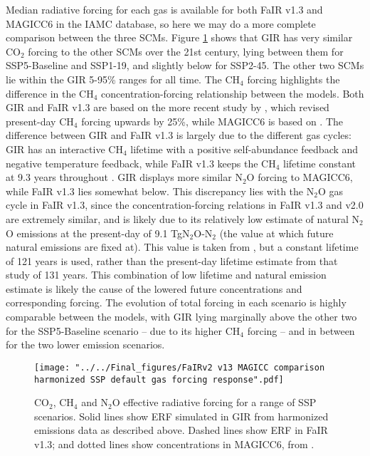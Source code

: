 \documentclass[gmd, manuscript]{copernicus}
\begin{document}
Median radiative forcing for each gas is available for both FaIR v1.3 and MAGICC6 in the IAMC database, so here we may do a more complete comparison between the three SCMs. Figure \ref{fig:SSPforcs} shows that GIR has very similar CO$_2$ forcing to the other SCMs over the 21st century, lying between them for SSP5-Baseline and SSP1-19, and slightly below for SSP2-45. The other two SCMs lie within the GIR 5-95\% ranges for all time. The CH$_4$ forcing highlights the difference in the CH$_4$ concentration-forcing relationship between the models. Both GIR and FaIR v1.3 are based on the more recent study by \cite{Etminan2016}, which revised present-day CH$_4$ forcing upwards by 25\%, while MAGICC6 is based on \cite{Myhre2013a}. The difference between GIR and FaIR v1.3 is largely due to the different gas cycles: GIR has an interactive CH$_4$ lifetime with a positive self-abundance feedback and negative temperature feedback, while FaIR v1.3 keeps the CH$_4$ lifetime constant at 9.3 years throughout \citep{Smith2017}. GIR displays more similar N$_2$O forcing to MAGICC6, while FaIR v1.3 lies somewhat below. This discrepancy lies with the N$_2$O gas cycle in FaIR v1.3, since the concentration-forcing relations in FaIR v1.3 and v2.0 are extremely similar, and is likely due to its relatively low estimate of natural N$_2$O emissions at the present-day of 9.1 TgN$_2$O-N$_2$ (the value at which future natural emissions are fixed at). This value is taken from \cite{Prather2012}, but a constant lifetime of 121 years is used, rather than the present-day lifetime estimate from that study of 131 years. This combination of low lifetime and natural emission estimate is likely the cause of the lowered future concentrations and corresponding forcing. The evolution of total forcing in each scenario is highly comparable between the models, with GIR lying marginally above the other two for the SSP5-Baseline scenario -- due to its higher CH$_4$ forcing -- and in between for the two lower emission scenarios.\\
\begin{figure}[t]
    \texttt{[image: "../../Final\_figures/FaIRv2 v13 MAGICC comparison harmonized SSP default gas forcing response".pdf]}
    \caption{CO$_2$, CH$_4$ and N$_2$O effective radiative forcing for a range of SSP scenarios. Solid lines show ERF simulated in GIR from harmonized emissions data as described above. Dashed lines show ERF in FaIR v1.3; and dotted lines show concentrations in MAGICC6, from \cite{Huppmann:2018:scenario-data}.}
    \label{fig:SSPforcs}
\end{figure}
\end{document}
